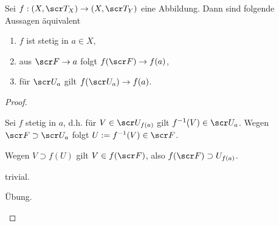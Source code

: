 \begin{st}
	Sei $f: (X, \scr T_X) \to (X, \scr T_Y)$ eine Abbildung.
	Dann sind folgende Aussagen äquivalent
	\begin{enumerate}[1)]
		\item
			$f$ ist stetig in $a \in X$,
		\item
			aus $\scr F \to a$ folgt $f(\scr F) \to f(a)$,
		\item
			für $\scr U_a$ gilt $f(\scr U_a) \to f(a)$.
	\end{enumerate}
	\begin{proof}
		\begin{segnb}[(1)$\implies$(2)]
			Sei $f$ stetig in $a$, d.h. für $V \in \scr U_{f(a)}$ gilt $f^{-1}(V) \in \scr U_a$.
			Wegen $\scr F \supset \scr U_a$ folgt $U := f^{-1}(V) \in \scr F$.

			Wegen $V \supset f(U)$ gilt $V \in f(\scr F)$, also $f(\scr F) \supset U_{f(a)}$.
		\end{segnb}
		\begin{segnb}[(2)$\implies$(3)]
			trivial.
		\end{segnb}
		\begin{segnb}[(3)$\implies$(1)]
			Übung.
		\end{segnb}
	\end{proof}
\end{st}
